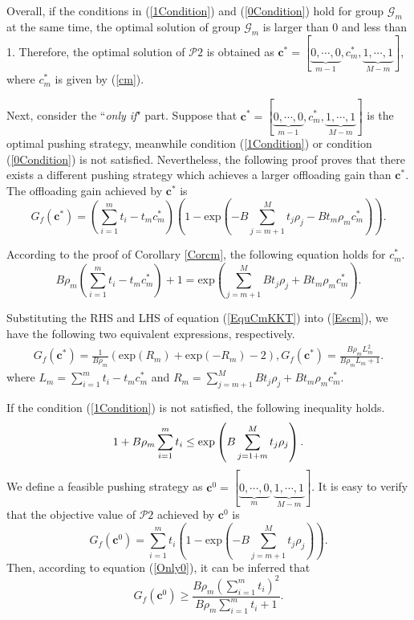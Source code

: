 \documentclass[12pt, draftclsnofoot, onecolumn]{IEEEtran}
\begin{document}
Overall, if the conditions in (\ref{1Condition}) and (\ref{0Condition}) hold for group $\mathcal{G}_m$ at the same time, the optimal solution of group $\mathcal{G}_m$ is larger than 0 and less than 1. Therefore, the optimal solution of $\mathcal{P}2$ is obtained as $\bm{c}^{\ast} =[\underbrace{0, \cdots, 0}_{m-1},c_m^{\ast},\underbrace{1, \cdots, 1}_{M-m}]$, where $c_m^{\ast}$ is given by (\ref{cm}).


Next, consider the ``\textit{only if}" part.
Suppose that $\bm{c}^{\ast}=[\underbrace{0, \cdots, 0}_{m-1},c_m^{\ast},\underbrace{1, \cdots, 1}_{M-m}]$ is the optimal pushing strategy, meanwhile condition (\ref{1Condition}) or condition (\ref{0Condition}) is not satisfied. Nevertheless, the following proof proves that there exists a different pushing strategy which achieves a larger offloading gain than $\bm{c}^{\ast}$.
The offloading gain achieved by $\bm{c}^{\ast}$ is
\begin{equation}\label{Escm}
G_{f}(\bm{c}^{\ast})=\left(\sum\limits_{i=1}^{m} t_i - t_m c_m^{\ast}\right)\left(1-\textrm{exp}\left(-B\sum\limits_{j=m+1}^{M} t_j\rho_j-B t_m\rho_m c_m^{\ast}\right)\right).
\end{equation}

According to the proof of Corollary \ref{Corcm}, the following equation holds for $c_m^{\ast}$.
\begin{equation} \label{EquCmKKT}
B \rho_m\left({\sum\limits_{i=1}^{m}t_i}-t_m c_m^{\ast}\right) + 1= \textrm{exp}\left({\sum\limits_{j=m+1}^{M} B t_j \rho_j + B t_m\rho_m c_m^{\ast}}\right).
\end{equation}

Substituting the RHS and LHS of equation (\ref{EquCmKKT}) into (\ref{Escm}), we have the following two equivalent expressions, respectively.
\begin{eqnarray}
G_{f}(\bm{c}^{\ast})=\frac{1}{B\rho_m}(\textrm{exp}(R_m)+\textrm{exp}(-R_m)-2),
G_{f}(\bm{c}^{\ast})= \frac{B\rho_m L_m^2}{B\rho_m L_m +1}.
\end{eqnarray}
where $L_m =\sum\limits_{i=1}^{m} t_i - t_m c_m^{\ast} $ and $R_m = \sum\limits_{j=m+1}^{M} B t_j\rho_j+B t_m\rho_m c_m^{\ast}$.

If the condition (\ref{1Condition}) is not satisfied, the following inequality holds.
\begin{equation}
1+B \rho_m \sum\limits_{i=1}^{m} t_i \leq \textrm{exp}\left(B\sum\limits_{j=1+m}^{M} t_j\rho_j\right). \label {Only0}\\
\end{equation}
We define a feasible pushing strategy as $\bm{c}^0 =[\underbrace{0, \cdots, 0}_{m},\underbrace{1, \cdots, 1}_{M-m}]$. It is easy to verify that the objective value of $\mathcal{P}2$ achieved by $\bm{c}^0$ is
\begin{equation}
G_{f}(\bm{c}^{0}) = \sum\limits_{i=1}^{m} t_i\left(1-\textrm{exp}\left(-B\sum\limits_{j=m+1}^{M} t_j\rho_j\right)\right).
\end{equation}
Then, according to equation (\ref{Only0}), it can be inferred that
\begin{equation}\label{end}
G_{f}(\bm{c}^0) \geq \frac{B\rho_m \left(\sum\limits_{i=1}^{m} t_i\right)^2}{B\rho_m \sum\limits_{i=1}^{m} t_i +1}.
\end{equation}
\end{document}
